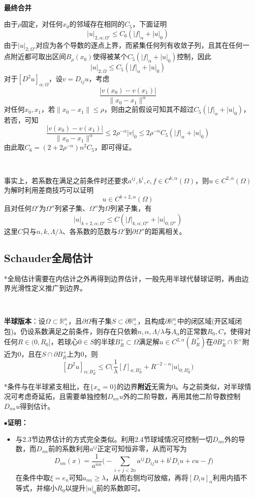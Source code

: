 \documentclass[a4paper,UTF8,fontset=windows,AutoFakeBold]{ctexart}
\newcommand{\proo}[1]{{\kaishu $\bullet$\textbf{证明：}
\begin{itemize}
    \item[] #1
\end{itemize}
}}
\begin{document}
{    \

    \textbf{最终合并}

    由于$\rho$固定，对任何$x_0$的邻域存在相同的$C_5$，下面证明
    $$|u|_{2,\alpha;\Omega'}\le C_6(|f|_\alpha+|u|_0)$$
    由于$|u|_{2;\Omega'}$对应为各个导数的逐点上界，而紧集任何列有收敛子列，且其在任何一点附近都可取出区间$B_\rho(x_0)$使得被某个$C_5(|f|_\alpha+|u|_0)$控制，因此
    $$|u|_{2;\Omega}\le C_5(|f|_\alpha+|u|_0)$$
    对于$[D^2u]_{\alpha;\Omega}$，设$v=D_{ij}u$，考虑
    $$\frac{|v(x_0)-v(x_1)|}{\|x_0-x_1\|^\alpha}$$
    对任何$x_0,x_1$，若$\|x_0-x_1\|\le\rho$，则由之前假设可知其不超过$C_5(|f|_\alpha+|u|_0)$，若否，可知
    $$\frac{|v(x_0)-v(x_1)|}{\|x_0-x_1\|^\alpha}\le2\rho^{-\alpha}|v|_0\le 2\rho^{-\alpha}C_5(|f|_\alpha+|u|_0)$$
    由此取$C_6=(2+2\rho^{-\alpha})n^2C_5$，即可得证。
}

\

事实上，若系数在满足之前条件时还要求$a^{ij},b^i,c,f\in C^{k,\alpha}(\Omega)$，则$u\in C^{2,\alpha}(\Omega)$为解时利用差商技巧可以证明
$$u\in C^{k+2,\alpha}(\Omega)$$
且对任何$\Omega'$为$\Omega''$列紧子集、$\Omega''$为$\Omega$列紧子集，有
$$|u|_{k+2,\alpha;\Omega'}\le C(|f|_{k,\alpha;\Omega''}+|u|_{0;\Omega''})$$
这里$C$只与$n,k,\Lambda/\lambda$、各系数的范数与$\Omega'$到$\partial\Omega''$的距离相关。

\subsection{Schauder全局估计}
*全局估计需要在内估计之外再得到边界估计，一般先用半球代替球证明，再由边界光滑性定义推广到边界。

\

\textbf{半球版本}：设$\Omega\subset\mathbb{R}^n_+$，且$\partial\Omega$有子集$S\subset\partial\mathbb{R}^n_+$，且构成$\partial\mathbb{R}^n_+$中的闭区域(开区域闭包)。仍设系数满足之前条件，则存在只依赖$n,\alpha,\Lambda/\lambda$与$\Lambda_\alpha$的正常数$R_0,C$，使得对任何$R\in(0,R_0]$，若球心$0\in S$的半球$B_R^+\subset\Omega$满足解$u\in C^{2,\alpha}(\bar{B}_R^+)$在$\partial B_R^+\cap\mathbb{R}^+$附近为0，且在$S\cap\partial B_R^+$上为0，则
$$[D^2u]_{\alpha;B_R^+}\le C\bigg(\frac{1}{\lambda}[f]_{a;B_R^+}+R^{-2-\alpha}|u|_{0;B_R^+}\bigg)$$

*条件与在半球紧支相比，在$\{x_n=0\}$的边界\textbf{附近}无需为0。与之前类似，对半球情况可考虑奇延拓，且需要单独控制$D_{nn}u$外的二阶导数，再用其他二阶导数控制$D_{nn}u$得到估计。

\proo{
    与2.3节边界估计的方式完全类似。利用2.4节球域情况可控制一切$D_{nn}$外的导数，而$D_{nn}$前的系数利用$a^{ij}$正定可知恒非零，从而可写为
    $$D_{nn}(x)=\frac{1}{a^{nn}}\bigg(-\sum_{i+j<2n}a^{ij}D_{ij}u+b^iD_iu+cu-f\bigg)$$
    在条件中取$\xi=e_n$可知$a_{nn}\ge\lambda$，从而右侧均可放缩，再将$[D_iu]_\alpha$利用内插不等式，并缩小$R_0$以提升$|u|_0$前的系数即可。
}
\end{document}
